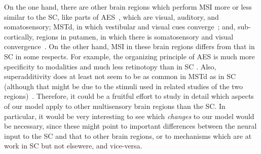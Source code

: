     On the one hand, there are other brain regions which perform \ac{MSI} more or less similar to the \ac{SC}, like parts of \ac{AES}~\citep{stein-and-stanford-2008}, which are visual, auditory, and somatosensory; \ac{MSTd}, in which vestibular and visual cues converge~\citep{duffy-1998}; and, sub-cortically, regions in putamen, in which there is somatosensory and visual convergence~\citep{graziano-and-gross-1993}.
    On the other hand, \ac{MSI} in these brain regions differs from that in \ac{SC} in some respects.
    For example, the organizing principle of \ac{AES} is much more specificity to modalities and much less retinotopy than in \ac{SC} \citep{olson-and-graybiel-1987,clarey-and-irvine-1990,meredith-2004,dehner-et-al-2004}.
    Also, superadditivity does at least not seem to be as common in \ac{MSTd} as in \ac{SC} (although that might be due to the stimuli used in related studies of the two regions)~\citep{morgan-et-al-2008}.
    Therefore, it could be a fruitful effort to study in detail which aspects of our model apply to other multisensory brain regions than the \ac{SC}.
    In particular, it would be very interesting to see which \emph{changes} to our model would be necessary, since these might point to important differences between the neural input to the \ac{SC} and that to other brain regions, or to mechanisms which are at work in \ac{SC} but not elsewere, and vice-versa.
